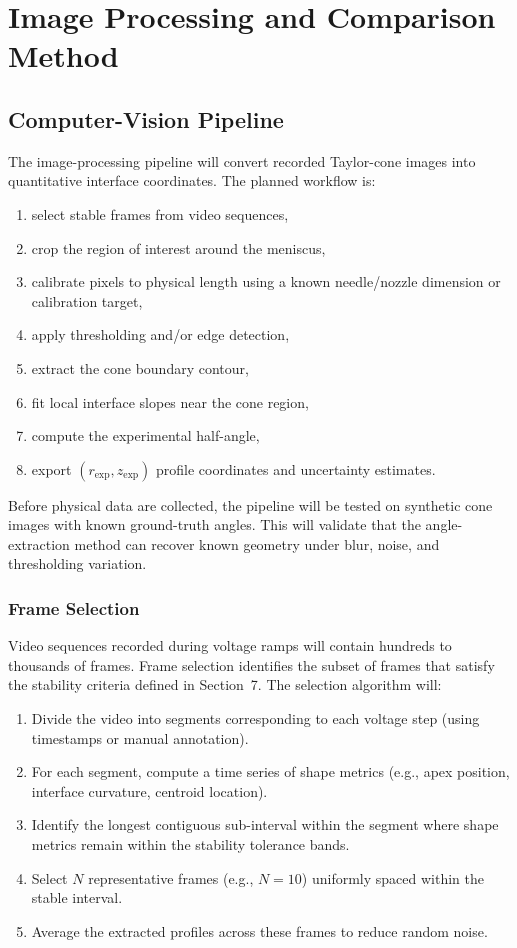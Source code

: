 \section{Image Processing and Comparison Method}\label{sec:image-processing}

\subsection{Computer-Vision Pipeline}

The image-processing pipeline will convert recorded Taylor-cone images into quantitative interface coordinates. The planned workflow is:
\begin{enumerate}
    \item select stable frames from video sequences,
    \item crop the region of interest around the meniscus,
    \item calibrate pixels to physical length using a known needle/nozzle dimension or calibration target,
    \item apply thresholding and/or edge detection,
    \item extract the cone boundary contour,
    \item fit local interface slopes near the cone region,
    \item compute the experimental half-angle,
    \item export $(r_{\mathrm{exp}},z_{\mathrm{exp}})$ profile coordinates and uncertainty estimates.
\end{enumerate}

Before physical data are collected, the pipeline will be tested on synthetic cone images with known ground-truth angles. This will validate that the angle-extraction method can recover known geometry under blur, noise, and thresholding variation.

\subsubsection{Frame Selection}

Video sequences recorded during voltage ramps will contain hundreds to thousands of frames. Frame selection identifies the subset of frames that satisfy the stability criteria defined in Section~7. The selection algorithm will:
\begin{enumerate}
    \item Divide the video into segments corresponding to each voltage step (using timestamps or manual annotation).
    \item For each segment, compute a time series of shape metrics (e.g., apex position, interface curvature, centroid location).
    \item Identify the longest contiguous sub-interval within the segment where shape metrics remain within the stability tolerance bands.
    \item Select $N$ representative frames (e.g., $N=10$) uniformly spaced within the stable interval.
    \item Average the extracted profiles across these frames to reduce random noise.
\end{enumerate}

